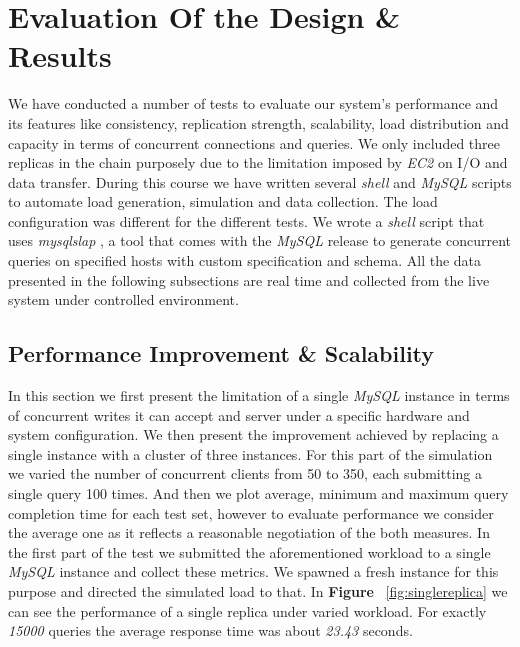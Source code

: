 \documentclass[12pt]{article}
\begin{document}
\section{Evaluation Of the Design \& Results} We have conducted a number of
tests to evaluate our system's performance and its features like consistency,
replication strength, scalability, load distribution and capacity in terms of
concurrent connections and queries. We only included three replicas in the chain
purposely due to the limitation imposed by \emph{EC2} \cite{freetier} on I/O and
data transfer. During this course we have written several \emph{shell} and
\emph{MySQL} scripts to automate load generation, simulation and data
collection. The load configuration was different for the different tests. We
wrote a \emph{shell} script that uses \emph{mysqlslap} \cite{mysqlslap}, a tool
that comes with the \emph{MySQL} release to generate concurrent queries on
specified hosts with custom specification and schema. All the data presented in
the following subsections are real time and collected from the live system under
controlled environment.  \subsection{Performance Improvement \& Scalability} In
this section we first present the limitation of a single \emph{MySQL} instance
in terms of concurrent writes it can accept and server under a specific hardware
and system configuration. We then present the improvement achieved by replacing
a single instance with a cluster of three instances. For this part of the
simulation we varied the number of concurrent clients from 50 to 350, each
submitting a single query 100 times. And then we plot average, minimum and
maximum query completion time for each test set, however to evaluate performance
we consider the average one as it reflects a reasonable negotiation of the both
measures. In the first part of the test we submitted the aforementioned workload
to a single \emph{MySQL} instance and collect these metrics. We spawned a fresh
instance for this purpose and directed the simulated load to that. In
\textbf{Figure }~\ref{fig:singlereplica} we can see the performance of a single
replica under varied workload. For exactly \emph{15000} queries the average
response time was about \emph{23.43} seconds.  
\end{document}
